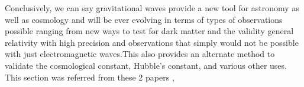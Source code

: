 \begin{enumerate}
    \hspace{1cm}Conclusively, we can say gravitational waves provide a new tool for astronomy as well as cosmology and will be ever evolving in terms of types of observations possible ranging from new ways to test for dark matter and the validity general relativity with high precision and observations that simply would not be possible with just electromagnetic waves.This also provides an alternate method to validate the cosmological constant, Hubble’s constant, and various other uses. This section was referred from these 2 papers \cite{Schutz_1999},\cite{Mukherjee_2020}

\end{enumerate}

\pagebreak